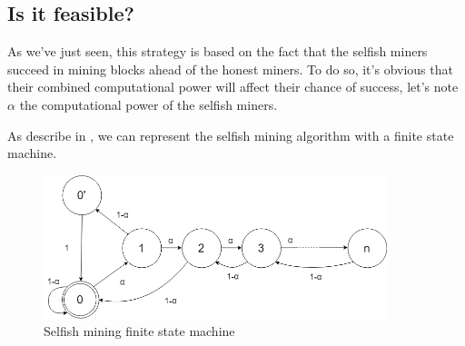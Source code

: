 \begin{figure}[ht]
\centering

\hspace{1cm}
\end{figure}
\medskip

\begin{figure}[ht]
\centering

\hspace{1cm}
\end{figure}

  \subsection{Is it feasible?}

As we've just seen, this strategy is based on the fact that the selfish miners succeed in mining blocks ahead of the honest miners. To do so, it's obvious that their combined computational power will affect their chance of success, let's note $\alpha$ the computational power of the selfish miners.

As describe in \cite{majority_not_enough}, we can represent the selfish mining algorithm with a finite state machine. \newline

\begin{figure}[ht]
\centering
\includegraphics[width=10cm]{Figures/finiteState}
\caption{Selfish mining finite state machine}
\end{figure}
\medskip

